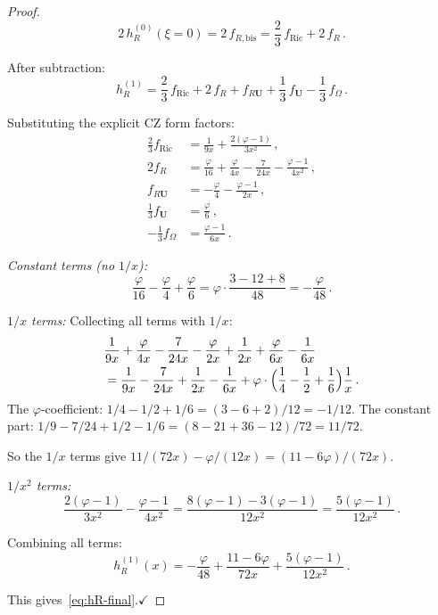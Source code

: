 \documentclass[11pt,a4paper]{article}
\theoremstyle{definition}
\theoremstyle{remark}
\begin{document}
\begin{proof}
\begin{equation*}
  2\,h_R^{(0)}(\xi=0)
  = 2\,f_{R,\mathrm{bis}}
  = \frac{2}{3}\,f_{\mathrm{Ric}} + 2\,f_R\,.
\end{equation*}

After subtraction:
\begin{equation}
  h_R^{(1)} = \frac{2}{3}\,f_{\mathrm{Ric}} + 2\,f_R + f_{R\mathbf{U}}
  + \frac{1}{3}\,f_{\mathbf{U}} - \frac{1}{3}\,f_\Omega\,.
  \label{eq:hR-intermediate}
\end{equation}

Substituting the explicit CZ form factors:
\begin{align*}
  \frac{2}{3}f_{\mathrm{Ric}}
  &= \frac{1}{9x} + \frac{2(\varphi-1)}{3x^2}\,,\\
  2f_R &= \frac{\varphi}{16} + \frac{\varphi}{4x}
    - \frac{7}{24x} - \frac{\varphi-1}{4x^2}\,,\\
  f_{R\mathbf{U}} &= -\frac{\varphi}{4}
    - \frac{\varphi-1}{2x}\,,\\
  \frac{1}{3}f_{\mathbf{U}} &= \frac{\varphi}{6}\,,\\
  -\frac{1}{3}f_\Omega &= \frac{\varphi-1}{6x}\,.
\end{align*}

\textit{Constant terms (no $1/x$):}
\begin{equation*}
  \frac{\varphi}{16} - \frac{\varphi}{4} + \frac{\varphi}{6}
  = \varphi\cdot\frac{3 - 12 + 8}{48} = -\frac{\varphi}{48}\,.
\end{equation*}

\textit{$1/x$ terms:}
Collecting all terms with $1/x$:
\begin{align*}
  &\frac{1}{9x} + \frac{\varphi}{4x} - \frac{7}{24x}
  - \frac{\varphi}{2x} + \frac{1}{2x}
  + \frac{\varphi}{6x} - \frac{1}{6x}\\
  &= \frac{1}{9x} - \frac{7}{24x} + \frac{1}{2x} - \frac{1}{6x}
  + \varphi\cdot\Bigl(\frac{1}{4} - \frac{1}{2} + \frac{1}{6}\Bigr)
  \frac{1}{x}\,.
\end{align*}
The $\varphi$-coefficient: $1/4 - 1/2 + 1/6 = (3-6+2)/12 = -1/12$.
The constant part: $1/9 - 7/24 + 1/2 - 1/6
= (8 - 21 + 36 - 12)/72 = 11/72$.

So the $1/x$ terms give $11/(72x) - \varphi/(12x)
= (11 - 6\varphi)/(72x)$.

\textit{$1/x^2$ terms:}
\begin{equation*}
  \frac{2(\varphi-1)}{3x^2} - \frac{\varphi-1}{4x^2}
  = \frac{8(\varphi-1) - 3(\varphi-1)}{12x^2}
  = \frac{5(\varphi-1)}{12x^2}\,.
\end{equation*}

Combining all terms:
\begin{equation*}
  h_R^{(1)}(x) = -\frac{\varphi}{48}
  + \frac{11 - 6\varphi}{72x}
  + \frac{5(\varphi-1)}{12x^2}\,.
\end{equation*}

This gives~\eqref{eq:hR-final}.\quad$\checkmark$
\end{proof}
\end{document}

